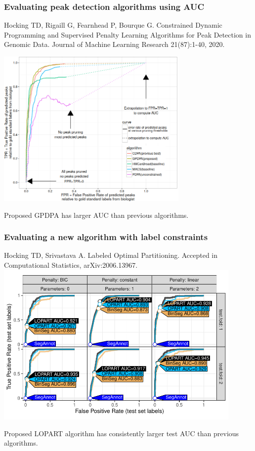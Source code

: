\documentclass[t]{beamer}
\begin{document}
\begin{frame}
  \frametitle{Evaluating peak detection algorithms using AUC}
{\scriptsize Hocking TD, Rigaill G, Fearnhead P, Bourque G. Constrained Dynamic Programming and Supervised Penalty Learning Algorithms for Peak Detection in Genomic Data. Journal of Machine Learning Research 21(87):1-40, 2020.}

  \includegraphics[width=0.7\textwidth]{figure-Hocking2020-roc}

  Proposed GPDPA has larger AUC than previous algorithms.

\end{frame}

\begin{frame}
  \frametitle{Evaluating a new algorithm with label constraints}
  {\scriptsize Hocking TD, Srivastava A. Labeled Optimal Partitioning. Accepted in Computational Statistics, arXiv:2006.13967.}
  \includegraphics[width=0.9\textwidth]{figure-LOPART-roc}

  Proposed LOPART algorithm has consistently larger test AUC than
  previous algorithms.
\end{frame}
\end{document}
